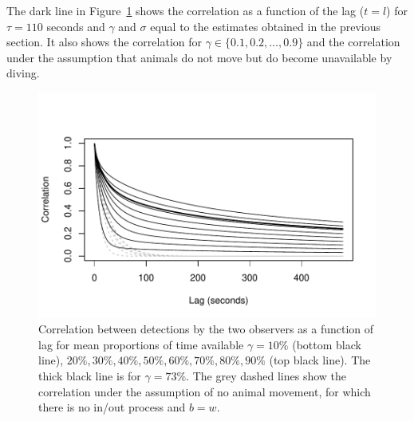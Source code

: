 \documentclass[useAMS, usenatbib, referee]{biom}\usepackage[]{graphicx}\usepackage[]{color}
\makeatletter
\def\maxwidth{ %
  \ifdim\Gin@nat@width>\linewidth
    \linewidth
  \else
    \Gin@nat@width
  \fi
}
\newenvironment{knitrout}{}{} %
\makeatother
\begin{document}


The dark line in Figure~\ref{fig:fig_correlation_plot} shows the correlation as a function of the lag ($t=l$) for $\tau=110$ seconds and $\gamma$ and $\sigma$ equal to the estimates obtained in the previous section. It also shows the correlation for $\gamma\in\{0.1, 0.2,\ldots,0.9\}$ and the correlation under the assumption that animals do not move but do become unavailable by diving.

\begin{knitrout}
\color{fgcolor}\begin{figure}

{\centering \includegraphics[width=\maxwidth]{figs/fig_correlation_plot-1} 

}

\caption[Correlation between detections by the two observers as a function of lag for mean proportions of time available \(\gamma=10\%\) (bottom black line), \(20\%, 30\%, 40\%, 50\%, 60\%, 70\%, 80\%, 90\%\) (top black line)]{Correlation between detections by the two observers as a function of lag for mean proportions of time available \(\gamma=10\%\) (bottom black line), \(20\%, 30\%, 40\%, 50\%, 60\%, 70\%, 80\%, 90\%\) (top black line). The thick black line is for \(\gamma=73\%\). The grey dashed lines show the correlation under the assumption of no animal movement, for which there is no in/out process and $b=w$.}\label{fig:fig_correlation_plot}
\end{figure}


\end{knitrout}
\end{document}
